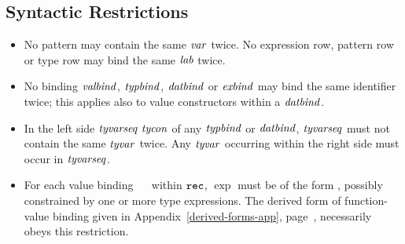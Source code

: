 \subsection{Syntactic Restrictions}
\begin{itemize}
\item No pattern may contain the same ${\it var}$ twice. No expression row,
      pattern row or type row may bind the same ${\it lab}$ twice.
\item No binding ${\it valbind}$, ${\it typbind}$, ${\it datbind}$ or ${\it exbind}$ may bind
      the same identifier twice; this applies also to value constructors within
      a ${\it datbind}$.
\item In the left side $\tyvarseq\ \tycon$ of any ${\it typbind}$ or ${\it datbind}$,
      ${\it tyvarseq}$ must not contain the same ${\it tyvar}$ twice. Any ${\it tyvar}$
      occurring within the right side must occur in ${\it tyvarseq}$. 
\item For each value binding \pat\ \ml{=} \exp\ within ${\tt rec}$,
      $\exp$ must be of the form \fnexp, possibly constrained by one
      or more type expressions. The derived form
      of function-value binding given in Appendix~\ref{derived-forms-app},
      page~\pageref{der-dec}, necessarily obeys this restriction.
\end{itemize}
